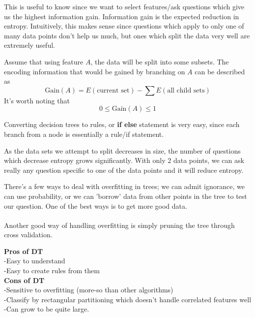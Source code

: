 \documentclass{chezarticle}
\begin{document}
This is useful to know since we want to select features/ask questions which give us the highest information gain. Information gain is the expected reduction in entropy. Intuitively, this makes sense since questions which apply to only one of many data points don't help us much, but ones which split the data very well are extremely useful. 
\begin{definition}
Assume that using feature $A$, the data will be split into some subsets. The encoding information that would be gained by branching on $A$ can be described as $$\text{Gain}(A) = E(\text{current set}) - \sum E(\text{all child sets})$$
It's worth noting that
$$0 \leq \text{Gain}(A) \leq 1$$
\end{definition}
Converting decision trees to rules, or \textbf{if else} statement is very easy, since each branch from a node is essentially a rule/if statement.
\begin{note}
As the data sets we attempt to split decreases in size, the number of questions which decrease entropy grows significantly. With only 2 data points, we can ask really any question specific to one of the data points and it will reduce entropy.
\end{note}
There's a few ways to deal with overfitting in trees; we can admit ignorance, we can use probability, or we can 'borrow' data from other points in the tree to test our question. One of the best ways is to get more good data. \\
\\
Another good way of handling overfitting is simply pruning the tree through cross validation.
\begin{note}
\textbf{Pros of DT}\\
-Easy to understand\\
-Easy to create rules from them\\
\textbf{Cons of DT}\\
-Sensitive to overfitting (more-so than other algorithms)\\
-Classify by rectangular partitioning which doesn't handle correlated features well\\
-Can grow to be quite large.
\end{note}
\end{document}
